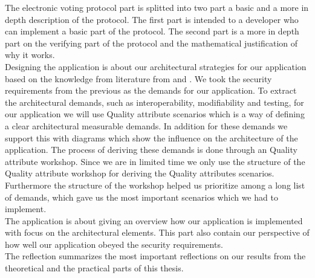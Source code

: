 \noindent
The electronic voting protocol part is splitted into two part a basic and a more in depth description of the protocol. The first part is intended to a developer who can implement a basic part of the protocol. The second part is a more in depth part on the verifying part of the protocol and the mathematical justification of why it works. \\   


\noindent
Designing the application is about our architectural strategies for our application based on the knowledge from literature from \cite{Bass} and \cite{Baerbak10}. We took the security requirements from the previous as the demands for our application. To extract the architectural demands, such as interoperability, modifiability and testing, for our application we will use Quality attribute scenarios which is a way of defining a clear architectural measurable demands. In addition for these demands we support this with diagrams which show the influence on the architecture of the application. The process of deriving these demands is done through an Quality attribute workshop. Since we are in  limited  time we only use the structure of the Quality attribute workshop for deriving the Quality attributes scenarios. Furthermore the structure of the workshop helped us prioritize among a long list of demands, which gave us the most important scenarios which we had to implement.\\


\noindent
The application is about giving an overview how our application is implemented with focus on the architectural elements. This part also contain our perspective of how well our application obeyed the security requirements. \\


\noindent
The reflection summarizes the most important reflections on our results from the theoretical and the practical parts of this thesis. 



  


 